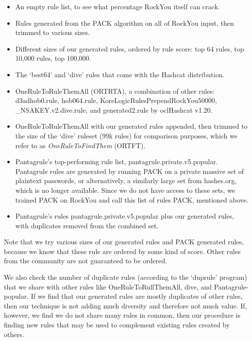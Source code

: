 \documentclass{article}
\begin{document}
\begin{itemize}

\item An empty rule list, to see what percentage RockYou itself can crack.

\item Rules generated from the PACK algorithm\autocite{PACK} on all of RockYou
input, then trimmed to various sizes.

\item Different sizes of our generated rules, ordered by rule score: top
64 rules, top 10,000 rules, top 100,000.

\item The `best64' and `dive' rules that come with the Hashcat distribution.

\item OneRuleToRuleThemAll (ORTRTA)\autocite{ortrta}, a combination of other rules:
d3adhob0.rule, hob064.rule, KoreLogicRulesPrependRockYou50000,\newline
\_NSAKEY.v2.dive.rule, and generated2.rule by oclHashcat v1.20.

\item OneRuleToRuleThemAll with our generated rules appended, then trimmed to
the size of the `dive' ruleset (99k rules) for comparison purposes, which we
refer to as \textit{OneRuleToFindThem} (ORTFT).

\item Pantagrule's\autocite{pantagrule} top-performing rule list,
pantagrule.private.v5.popular. Pantagrule rules are generated by running PACK
on a private massive set of plaintext passwords, or alternatively, a similarly
large set from hashes.org, which is no longer available. Since we do not have
access to these sets, we trained PACK on RockYou and call this list of rules
PACK, mentioned above.

\item Pantagrule's rules pantagrule.private.v5.popular plus our generated rules,
with duplicates removed from the combined set.

\end{itemize}

Note that we try various sizes of our generated rules and PACK generated rules,
because we know that these rule are ordered by some kind of score. Other
rules from the community are not guaranteed to be ordered.

We also check the number of duplicate rules (according to the `duprule'
program\autocite{duprule}) that we share with other rules like
OneRuleToRullThemAll, dive, and Pantagrule-popular. If we find that our
generated rules are mostly duplicates of other rules, then our technique is not
adding much diversity and therefore not much value. If, however, we find we do
not share many rules in common, then our procedure is finding new rules that
may be used to complement existing rules created by others.
\end{document}
